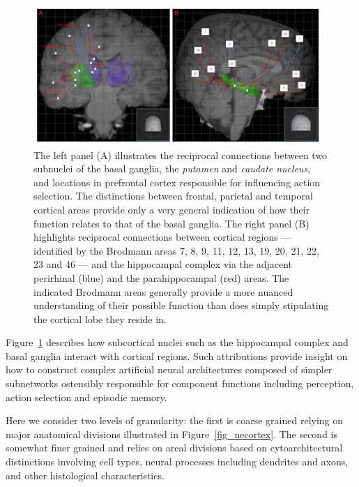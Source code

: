 \documentclass[letterpaper,11pt]{article}
\def\colorred#1{{\color{red}#1}}
\def\urlh#1{{}}
\def\emdash{---}
\begin{document}
\begin{figure}
%
  \begin{center} 
    \includegraphics[height=150pt]{./figures/Brodmann_Basal_Ganglia_Hippocampus.jpg} %
  \end{center}
%
  \caption{The left panel ({\colorred{A}}) illustrates the reciprocal connections between two subnuclei of the basal ganglia, the {\it{putamen}} and {\it{caudate nucleus}}, and locations in prefrontal cortex responsible for influencing action selection. The distinctions between frontal, parietal and temporal cortical areas provide only a very general indication of how their function relates to that of the basal ganglia. The right panel ({\colorred{B}}) highlights reciprocal connections between cortical regions {\emdash{}} identified by the Brodmann areas 7, 8, 9, 11, 12, 13, 19, 20, 21, 22, 23 and 46 {\emdash{}} and the hippocampal complex via the adjacent perirhinal (blue) and the parahippocampal (red) areas. The indicated Brodmann areas generally provide a more nuanced understanding of their possible function than does simply stipulating the cortical lobe they reside in.}
%    
  \label{fig_broadman}
%
\end{figure}


Figure~{\urlh{#fig_Brodmann_Basal_Ganglia_Hippocampus}{\ref{fig_broadman}}} describes how subcortical nuclei such as the hippocampal complex and basal ganglia interact with cortical regions. Such attributions provide insight on how to construct complex artificial neural architectures composed of simpler subnetworks ostensibly responsible for component functions including perception, action selection and episodic memory.

Here we consider two levels of granularity: the first is coarse grained relying on major anatomical divisions illustrated in Figure~{\urlh{#fig_Human_Brain_Neocortex_Function}{\ref{fig_necortex}}}. The second is somewhat finer grained and relies on areal divisions based on cytoarchitectural distinctions involving cell types, neural processes including dendrites and axons, and other histological characteristics.
\end{document}
